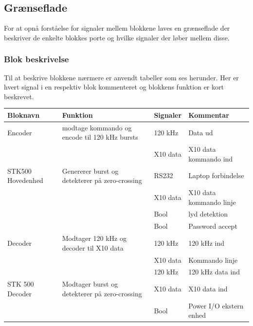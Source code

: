 \clearpage
\newpage

\begin{table}[htbp] %
\subsection{Grænseflade}
For at opnå forståelse for signaler mellem blokkene laves en grænseflade der beskriver de enkelte blokkes porte og hvilke signaler der løber mellem disse.

\subsubsection{Blok beskrivelse}
Til at beskrive blokkene nærmere er anvendt tabeller som ses herunder. Her er hvert signal i en respektiv blok kommenteret og blokkens funktion er kort beskrevet. 

\begin{tabular}{|p{}|p{}|p{}|p{}|}
\hline
\textbf{Bloknavn} & \textbf{Funktion} & \textbf{Signaler} & \textbf{Kommentar} \\ \hline

Encoder & modtage kommando og encode til 120 kHz bursts & 120 kHz & Data ud \\ \cline{3-4}	
& & X10 data & X10 data kommando ind \\ \hline

STK500 Hovedenhed & Genererer burst og detekterer på zero-crossing & RS232 & Laptop forbindelse \\ \cline{3-4}
& & X10 data & X10 data kommando linje \\ \cline{3-4}
& & Bool & lyd detektion \\ \cline{3-4}
& & Bool & Password accept \\ \hline

Decoder & Modtager 120 kHz og decoder til X10 data & 120 kHz & 120 kHz ind \\ \cline{3-4}
& & X10 data & Kommando linje \\ \cline{3-4}
& & 120 kHz & 120 kHz data ind \\ \hline

STK 500 Decoder & Modtager burst og detekterer på zero-crossing & X10 data & X10 data ind \\ \cline{3-4}
&& Bool & Power I/O ekstern enhed \\ \hline 
\end{tabular}
\end{table}

